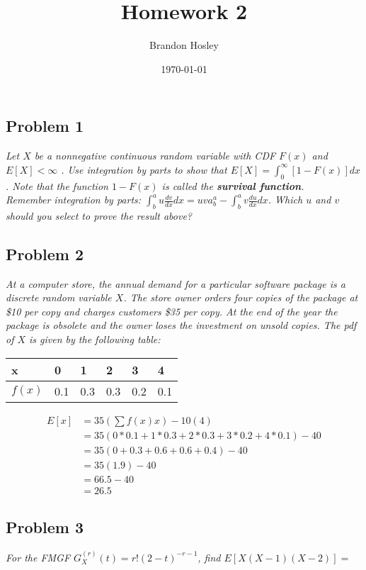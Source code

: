 \documentclass[a4paper,man,natbib]{apa6}
\title{Homework 2}
\author{Brandon Hosley}
\date{\today}
\affiliation{STAT 587 - Introduction to Probability and Statistics}
\begin{document}
\maketitle
\raggedbottom
\singlespacing

\subsection{Problem 1}
\emph{Let $X$ be a nonnegative continuous random variable with CDF $F(x)$ and 
	$E[X]<\infty$
	. Use integration by parts to show that $E[X] = \int_{0}^{\infty}[1−F(x)] dx$.  Note that the function 
	$1−F(x)$ is called the \textbf{survival function}. \\
	Remember integration by parts: $\int_{b}^{a} u \frac{dv}{dx} dx = uv a_b^a -\int_{b}^{a}v\frac{du}{dx} dx$.  Which $u$ and $v$ should you select to prove the result above?}



\subsection{Problem 2}
\emph{At a computer store, the annual demand for a particular software package is a discrete random variable $X$. The store owner orders four copies of the package at \$10 per copy and charges customers \$35 per copy. At the end of the year the package is obsolete and the owner loses the investment on unsold copies. The pdf of $X$ is given by the following table:}\\
	\begin{tabular}{l|lllll}
		\textbf{x }  & 0   & 1   & 2   & 3   & 4   \\ \hline
		$f(x)$ & 0.1 & 0.3 & 0.3 & 0.2 & 0.1
	\end{tabular}

\begin{align*}
	E[x] &= 35(\sum f(x) x) - 10(4) \\
	&= 35(0*0.1 + 1*0.3 + 2*0.3+ 3*0.2 + 4*0.1) - 40 \\
	&= 35(0 + 0.3 + 0.6 + 0.6 + 0.4) -40 \\
	&= 35(1.9) - 40 \\
	&= 66.5 - 40 \\
	&= 26.5
\end{align*}


\subsection{Problem 3}
\emph{For the FMGF $G_X^{(r)}(t) = r!(2−t)^{−r−1}$, find $E[X(X-1)(X-2)] =$}
\end{document}
